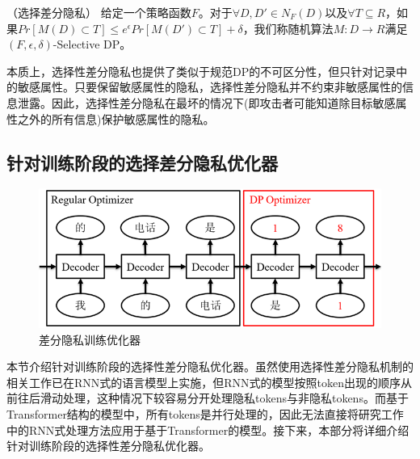 \begin{definition}{（选择差分隐私\cite{selectivedp}）}
给定一个策略函数$F$。对于$∀D, D'\in N_F (D)$以及$∀T⊆R$，如果$Pr[M(D)\subset T]\leq e^\epsilon Pr[M(D')\subset T]+\delta$，我们称随机算法$M:D\rightarrow R$满足$(F,\epsilon,\delta)$-Selective DP。
\label{SDP}
\end{definition}

本质上，选择性差分隐私也提供了类似于规范DP的不可区分性，但只针对记录中的敏感属性。只要保留敏感属性的隐私，选择性差分隐私并不约束非敏感属性的信息泄露。因此，选择性差分隐私在最坏的情况下(即攻击者可能知道除目标敏感属性之外的所有信息)保护敏感属性的隐私。

\subsection{针对训练阶段的选择差分隐私优化器}



\begin{figure}[h]
	\centering
	\includegraphics[width=0.7\linewidth]{figures/SDP_Optim.png}
	\caption{差分隐私训练优化器}
	\label{SDP_Optim}
\end{figure}

本节介绍针对训练阶段的选择性差分隐私优化器。虽然使用选择性差分隐私机制的相关工作\cite{selectivedp}已在RNN式的语言模型上实施，但RNN式的模型按照token出现的顺序从前往后滑动处理，这种情况下较容易分开处理隐私tokens与非隐私tokens。而基于Transformer结构的模型中，所有tokens是并行处理的，因此无法直接将研究工作\cite{selectivedp}中的RNN式处理方法应用于基于Transformer的模型。接下来，本部分将详细介绍针对训练阶段的选择性差分隐私优化器。


